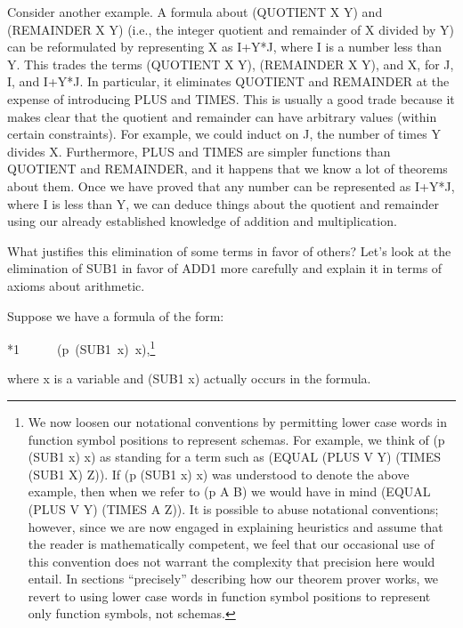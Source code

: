 \documentclass[11pt]{book}
\newenvironment{pubasis}{\begin{flushleft}\ttfamily\small}{\normalsize\rmfamily\end{flushleft}}
\begin{document}
Consider another example.  A formula about (QUOTIENT X Y) and (REMAINDER X Y)
(i.e., the integer quotient and remainder of X divided
by Y) can be reformulated by representing X as I+Y*J, where I is a number less
than Y.  This trades the terms (QUOTIENT X Y), (REMAINDER X Y), and X, for
J, I, and I+Y*J.  In particular, it eliminates QUOTIENT and REMAINDER
at the expense of introducing PLUS and TIMES.  This is usually a
good trade because it makes clear that the quotient and remainder can
have arbitrary values (within certain constraints).  For example, we
could induct on J, the number of times Y divides X.  Furthermore,
PLUS and TIMES are simpler functions than QUOTIENT and REMAINDER, and it happens
that we know a lot of theorems about them.  Once we have proved that
any number can be represented as I+Y*J, where I is less than Y, we
can deduce things about the quotient and remainder using our
already established knowledge of addition and multiplication.

What justifies this elimination of some terms in favor of others?
Let's look at the elimination of SUB1 in favor of ADD1 more
carefully and explain it in terms of axioms about arithmetic.

Suppose we have a formula of the form:
\begin{pubasis}
*1~~~~~~(p~(SUB1~x)~x),\footnote{We now loosen our notational conventions by permitting lower case words in function symbol positions to represent schemas.  For example, we think of (p (SUB1 x) x) as standing for a term such as (EQUAL (PLUS V Y) (TIMES (SUB1 X) Z)).  If (p (SUB1 x) x) was understood to denote the above example, then when we refer to (p A B) we would have in mind (EQUAL (PLUS V Y) (TIMES A Z)). It is possible to  abuse notational conventions; however, since we are now engaged in explaining heuristics and assume that the reader is mathematically competent, we feel that our occasional use of this convention does not warrant the complexity that precision here would entail.  In sections ``precisely'' describing how our theorem prover works, we revert to using lower case words in function symbol positions to represent only function symbols, not schemas.}\\
\end{pubasis}
where x is a variable and (SUB1 x) actually occurs in the formula.
\end{document}
